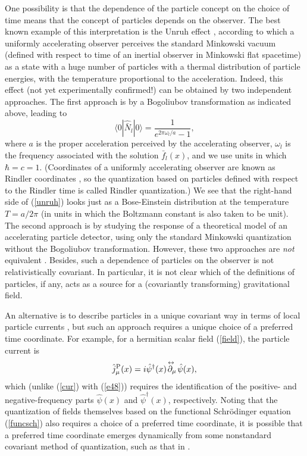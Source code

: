 \documentclass[12pt]{article}
\begin{document}
One possibility is that the dependence of the particle concept 
on the choice of time means that the concept of particles 
depends on the observer. The best known example of this interpretation 
is the Unruh effect \cite{unruh,unruh2,birdav}, according to which 
a uniformly accelerating observer perceives the standard Minkowski vacuum
(defined with respect to time of an inertial observer in Minkowski flat 
spacetime) as a state with a huge number of particles with a thermal 
distribution of particle energies, with the temperature proportional 
to the acceleration. Indeed, this effect (not yet experimentally confirmed!)
can be obtained by two independent 
approaches. The first approach is by a Bogoliubov transformation as indicated
above, leading to \cite{unruh,birdav}
\begin{equation}\label{unruh}
\langle 0|\hat{\bar{N}}_l|0\rangle=\frac{1}{e^{2\pi\omega_l/a}-1},
\end{equation}
where $a$ is the proper acceleration perceived by the 
accelerating observer, $\omega_l$ is the frequency associated with 
the solution $\bar{f}_l(x)$, 
and we use units in which $\hbar=c=1$.
(Coordinates of a uniformly accelerating observer are known
as Rindler coordinates \cite{rind}, so the
quantization based on particles defined with respect 
to the Rindler time is called 
Rindler quantization.) We see that the right-hand side of (\ref{unruh}) looks 
just as a Bose-Einstein distribution at the temperature $T=a/2\pi$
(in units in which the Boltzmann constant is also taken to be unit).
The second approach is by studying the response of 
a theoretical model of an accelerating particle detector, 
using only the standard 
Minkowski quantization without the Bogoliubov transformation. 
However, these two approaches are {\em not}
equivalent \cite{padmun,nikolun}. Besides, such a dependence of particles 
on the observer is not relativistically covariant. In particular, it is not 
clear which of the definitions of particles, if any, acts as a source 
for a (covariantly transforming) gravitational field. 

An alternative 
is to describe particles in a unique covariant way in terms of local 
particle currents \cite{nikolcur}, but such an approach requires a 
unique choice of a preferred time coordinate. For example, for a hermitian 
scalar field (\ref{field}), the particle current is
\begin{equation}\label{enik1}
\hat{j}^{\rm P}_{\mu}(x)=i\hat{\psi}^{\dagger}(x) 
\!\stackrel{\leftrightarrow\;}{\partial_{\mu}}\! \hat{\psi}(x) ,
\end{equation}
which (unlike (\ref{cur}) with (\ref{e48})) requires the identification of 
the positive- and negative-frequency parts 
$\hat{\psi}(x)$ and $\hat{\psi}^{\dagger}(x)$, respectively. 
Noting that the quantization of fields 
themselves based on the functional Schr\"odinger equation 
(\ref{funcsch}) also requires a choice of a preferred time coordinate, 
it is possible that a preferred time coordinate emerges dynamically 
from some nonstandard covariant method of quantization, such as that in
\cite{nikddw}.
\end{document}
